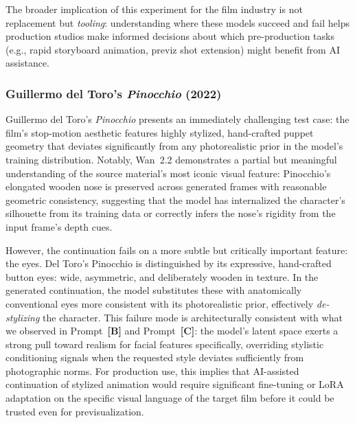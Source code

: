 \documentclass[sigconf]{acmart}
\begin{document}
The broader implication of this experiment for the film industry is not
replacement but \textit{tooling}: understanding where these models
succeed and fail helps production studios make informed decisions about
which pre-production tasks (e.g., rapid storyboard animation,
previz shot extension) might benefit from AI assistance.

\subsubsection*{Guillermo del Toro's \textit{Pinocchio} (2022)}


\noindent Guillermo del Toro's \textit{Pinocchio} presents an
immediately challenging test case: the film's stop-motion aesthetic
features highly stylized, hand-crafted puppet geometry that deviates
significantly from any photorealistic prior in the model's training
distribution. Notably, Wan~2.2 demonstrates a partial but meaningful
understanding of the source material's most iconic visual feature:
Pinocchio's elongated wooden nose is preserved across generated frames
with reasonable geometric consistency, suggesting that the model has
internalized the character's silhouette from its training data or
correctly infers the nose's rigidity from the input frame's depth cues.

However, the continuation fails on a more subtle but critically
important feature: the eyes. Del Toro's Pinocchio is distinguished by
its expressive, hand-crafted button eyes: wide, asymmetric, and
deliberately wooden in texture. In the generated continuation, the
model substitutes these with anatomically conventional eyes more
consistent with its photorealistic prior, effectively
\textit{de-stylizing} the character. This failure mode is architecturally
consistent with what we observed in Prompt~\textbf{[B]} and
Prompt~\textbf{[C]}: the model's latent space exerts a strong pull
toward realism for facial features specifically, overriding stylistic
conditioning signals when the requested style deviates sufficiently
from photographic norms. For production use, this implies that
AI-assisted continuation of stylized animation would require significant
fine-tuning or LoRA adaptation on the specific visual language of
the target film before it could be trusted even for previsualization.
\end{document}

